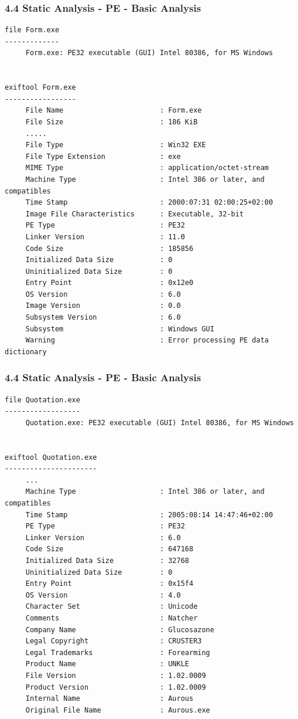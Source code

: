 \begin{frame}[fragile]
  \frametitle{4.4 Static Analysis - PE - Basic Analysis}
  \begin{lstlisting}[basicstyle=\tiny]
file Form.exe
-------------
     Form.exe: PE32 executable (GUI) Intel 80386, for MS Windows


exiftool Form.exe
-----------------
     File Name                       : Form.exe
     File Size                       : 186 KiB
     .....
     File Type                       : Win32 EXE
     File Type Extension             : exe
     MIME Type                       : application/octet-stream
     Machine Type                    : Intel 386 or later, and compatibles
     Time Stamp                      : 2000:07:31 02:00:25+02:00
     Image File Characteristics      : Executable, 32-bit
     PE Type                         : PE32
     Linker Version                  : 11.0
     Code Size                       : 185856
     Initialized Data Size           : 0
     Uninitialized Data Size         : 0
     Entry Point                     : 0x12e0
     OS Version                      : 6.0
     Image Version                   : 0.0
     Subsystem Version               : 6.0
     Subsystem                       : Windows GUI
     Warning                         : Error processing PE data dictionary
  \end{lstlisting}
\end{frame}


\begin{frame}[fragile]
  \frametitle{4.4 Static Analysis - PE - Basic Analysis}
  \begin{lstlisting}[basicstyle=\tiny]
file Quotation.exe
------------------
     Quotation.exe: PE32 executable (GUI) Intel 80386, for MS Windows


exiftool Quotation.exe
----------------------  
     ...
     Machine Type                    : Intel 386 or later, and compatibles
     Time Stamp                      : 2005:08:14 14:47:46+02:00
     PE Type                         : PE32
     Linker Version                  : 6.0
     Code Size                       : 647168
     Initialized Data Size           : 32768
     Uninitialized Data Size         : 0
     Entry Point                     : 0x15f4
     OS Version                      : 4.0
     Character Set                   : Unicode
     Comments                        : Natcher
     Company Name                    : Glucosazone
     Legal Copyright                 : CRUSTER3
     Legal Trademarks                : Forearming
     Product Name                    : UNKLE
     File Version                    : 1.02.0009
     Product Version                 : 1.02.0009
     Internal Name                   : Aurous
     Original File Name              : Aurous.exe
  \end{lstlisting}
\end{frame}


